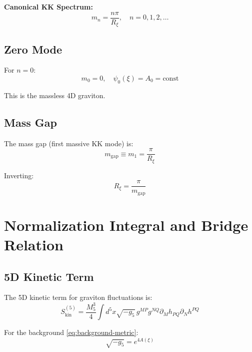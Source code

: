 \documentclass[11pt,a4paper]{article}
\newcommand{\Rxi}{R_\xi}
\newcommand{\Mfive}{M_5}
\newcommand{\mgap}{m_{\mathrm{gap}}}
\begin{document}
\textbf{Canonical KK Spectrum:}
\begin{equation}
\boxed{m_n = \frac{n\pi}{\Rxi}, \quad n = 0, 1, 2, \ldots}
\label{eq:spectrum-canonical}
\end{equation}

\subsection{Zero Mode}

For $n = 0$:
\begin{equation}
m_0 = 0, \quad \psi_0(\xi) = A_0 = \mathrm{const}
\label{eq:zero-mode}
\end{equation}

This is the massless 4D graviton.

\subsection{Mass Gap}

The mass gap (first massive KK mode) is:
\begin{equation}
\mgap \equiv m_1 = \frac{\pi}{\Rxi}
\label{eq:mass-gap-def}
\end{equation}

Inverting:
\begin{equation}
\boxed{\Rxi = \frac{\pi}{\mgap}}
\label{eq:Rxi-from-mgap}
\end{equation}

\section{Normalization Integral and Bridge Relation}

\subsection{5D Kinetic Term}

The 5D kinetic term for graviton fluctuations is:
\begin{equation}
S_{\mathrm{kin}}^{(5)} = \frac{\Mfive^3}{4} \int d^5x \sqrt{-g_5}\, g^{M P} g^{N Q}
\partial_M h_{PQ} \partial_N h^{PQ}
\label{eq:5D-kinetic}
\end{equation}

For the background \eqref{eq:background-metric}:
\begin{equation}
\sqrt{-g_5} = e^{4A(\xi)}
\label{eq:sqrt-g5}
\end{equation}
\end{document}
